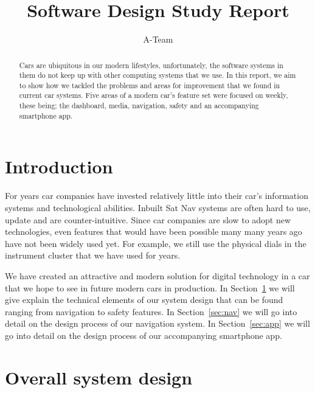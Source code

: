 \documentclass{article}
\title{Software Design Study Report}
\author{A-Team}
\begin{document}
\maketitle

\begin{abstract}
Cars are ubiquitous in our modern lifestyles, unfortunately, the software systems in them do not keep up with other computing systems that we use. In this report, we aim to show how we tackled the problems and areas for improvement that we found in current car systems. Five areas of a modern car's feature set were focused on weekly, these being; the dashboard, media, navigation, safety and an accompanying smartphone app.
\end{abstract}

\section*{Introduction}
For years car companies have invested relatively little into their car's information systems and technological abilities. Inbuilt Sat Nav systems are often hard to use, update and are counter-intuitive. Since car companies are slow to adopt new technologies, even features that would have been possible many many years ago have not been widely used yet. For example, we still use the physical dials in the instrument cluster that we have used for years.

We have created an attractive and modern solution for digital technology in a car that we hope to see in future modern cars in production. In Section~\ref{sec:system-design} we will give explain the technical elements of our system design that can be found ranging from navigation to safety features. In Section~\ref{sec:nav} we will go into detail on the design process of our navigation system. In Section~\ref{sec:app} we will go into detail on the design process of our accompanying smartphone app.

\section{Overall system design}\label{sec:system-design}
\end{document}
